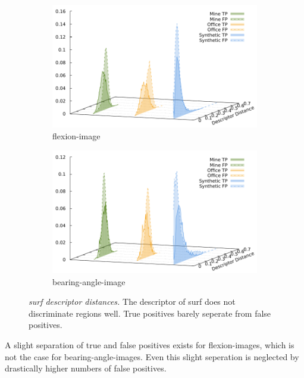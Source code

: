 \begin{figure}[htb]
\begin{subfigure}[t]{0.45\linewidth}
    \includegraphics[width=\linewidth]{chapter06/results/SURF/flexion/descriptor_distances.pdf}%
    \caption{\gls{flexion-image}}
\end{subfigure}\quad
\begin{subfigure}[t]{0.45\linewidth}
    \includegraphics[width=\linewidth]{chapter06/results/SURF/bearing/descriptor_distances.pdf}%
    \caption{\gls{bearing-angle-image}}
\end{subfigure}
\caption[\acrshort{surf} descriptor distances]{\emph{\acrshort{surf} descriptor distances.} The descriptor of \acrshort{surf} does not discriminate regions well. True positives barely seperate from false positives.}\label{fig:surf_descriptor_distance}
\end{figure}
A slight separation of true and false positives exists for \glspl{flexion-image}, which is not the case for \glspl{bearing-angle-image}.
Even this slight seperation is neglected by drastically higher numbers of false positives.
